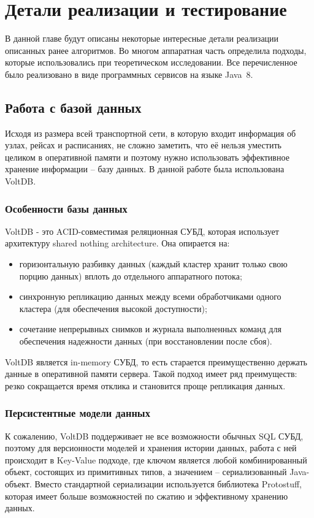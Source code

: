 \chapter{Детали реализации и тестирование}
В данной главе будут описаны некоторые интересные детали реализации описанных ранее алгоритмов. Во многом аппаратная часть определила подходы, которые использовались при теоретическом исследовании. Все перечисленное было реализовано в виде программных сервисов на языке Java~8.
\section{Работа с базой данных}
Исходя из размера всей транспортной сети, в которую входит информация об узлах, рейсах и расписаниях, не сложно заметить, что её нельзя уместить целиком в оперативной памяти и поэтому нужно использовать эффективное хранение информации -- базу данных. В данной работе была использована VoltDB.
\subsection{Особенности базы данных}
VoltDB - это ACID-совместимая реляционная СУБД, которая использует архитектуру shared nothing architecture. Она опирается на:
\begin{itemize}
	\item горизонтальную разбивку данных (каждый кластер хранит только свою порцию данных) вплоть до отдельного аппаратного потока;
	\item синхронную репликацию данных между всеми обработчиками одного кластера (для обеспечения высокой доступности);
	\item сочетание непрерывных снимков и журнала выполненных команд для обеспечения надежности данных (при восстановлении после сбоя).
\end{itemize}
VoltDB является in-memory СУБД, то есть старается преимущественно держать данные в оперативной памяти сервера. Такой подход имеет ряд преимуществ: резко сокращается время отклика и становится проще репликация данных.
\subsection{Персистентные модели данных}
К сожалению, VoltDB поддерживает не все возможности обычных SQL СУБД, поэтому для версионности моделей и хранения истории данных, работа с ней происходит в Key-Value подходе, где ключом является любой комбинированный объект, состоящих из примитивных типов, а значением -- сериализованный Java-объект. Вместо стандартной сериализации используется библиотека Protostuff, которая имеет больше возможностей по сжатию и эффективному хранению данных.

